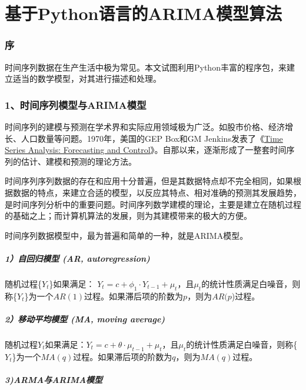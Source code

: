 \documentclass[]{article}
\date{}
\let\oldsubparagraph\subparagraph
\renewcommand{\subparagraph}[1]{\oldsubparagraph{#1}\mbox{}}
\begin{document}
\section{基于Python语言的ARIMA模型算法}\label{header-c1}

\subsubsection{序}\label{header-c517}

时间序列数据在生产生活中极为常见。本文试图利用Python丰富的程序包，来建立适当的数学模型，对其进行描述和处理。

\subsubsection{1、时间序列模型与ARIMA模型}\label{header-c477}

时间序列的建模与预测在学术界和实际应用领域极为广泛。如股市价格、经济增长、人口数量等问题。1970年，美国的GEP
Box和GM
Jenkins发表了《\href{http://xueshu.baidu.com/s?wd=paperuri\%3A\%28715e90892dfadd5708d83ebc3e2110e2\%29\&filter=sc_long_sign\&tn=SE_xueshusource_2kduw22v\&sc_vurl=http\%3A\%2F\%2Fwww.ams.org\%2Fmathscinet-getitem\%3Fmr\%3D272138\&ie=utf-8\&sc_us=5034082631192868346}{Time
Series Analysis: Forecasting and
Control}》。自那以来，逐渐形成了一整套时间序列的估计、建模和预测的理论方法。

时间序列序列数据的存在和应用十分普遍，但是其数据特点却不完全相同，如果根据数据的特点，来建立合适的模型，以反应其特点、相对准确的预测其发展趋势，是时间序列分析中的重要问题。时间序列数学建模的理论，主要是建立在随机过程的基础之上；而计算机算法的发展，则为其建模带来的极大的方便。

时间序列数据模型中，最为普遍和简单的一种，就是ARIMA模型。

\subparagraph{1）自回归模型 (AR, autoregression)}\label{header-c92}

随机过程\{\(Y_t\)\}如果满足：
\(Y_t=c+\phi_1 \cdot Y_{t-1}+\mu_t\)，且\(\mu_t\)的统计性质满足白噪音，则称\{\(Y_t\)\}为一个\(AR(1)\)过程。如果滞后项的阶数为\(p\)，则为\(AR(p\))过程。

\subparagraph{2）移动平均模型 (MA, moving average)}\label{header-c100}

随机过程\({Y_t}\)如果满足：\(Y_t = c+\theta \cdot \mu_{t-1} + \mu_t\)，且\(\mu_t\)的统计性质满足白噪音，则称\{\(Y_t\)\}为一个\(MA(q)\)过程。如果滞后项的阶数为\(q\)，则为\(MA(q)\)过程。

\subparagraph{3)ARMA与ARIMA模型}\label{header-c108}
\end{document}
